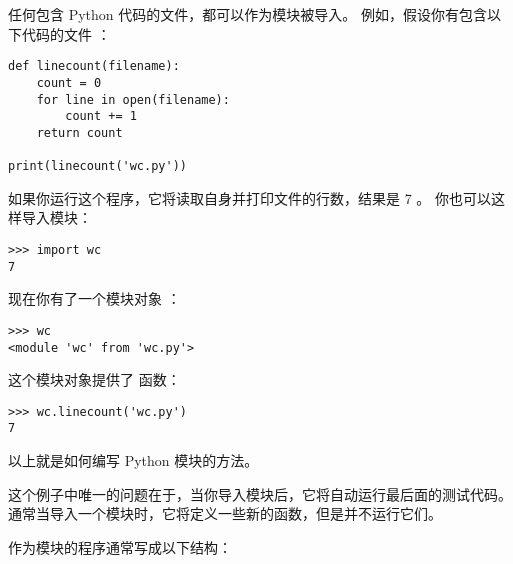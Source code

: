 {{{{{{{任何包含 Python 代码的文件，都可以作为模块被导入。
例如，假设你有包含以下代码的文件  ：

\begin{lstlisting}
def linecount(filename):
    count = 0
    for line in open(filename):
        count += 1
    return count

print(linecount('wc.py'))
\end{lstlisting}

%

如果你运行这个程序，它将读取自身并打印文件的行数，结果是 7 。
你也可以这样导入模块：

\begin{lstlisting}
>>> import wc
7
\end{lstlisting}

%

现在你有了一个模块对象  ：

  

\begin{lstlisting}
>>> wc
<module 'wc' from 'wc.py'>
\end{lstlisting}

%

这个模块对象提供了  函数：

\begin{lstlisting}
>>> wc.linecount('wc.py')
7
\end{lstlisting}

%

以上就是如何编写 Python 模块的方法。


这个例子中唯一的问题在于，当你导入模块后，它将自动运行最后面的测试代码。
通常当导入一个模块时，它将定义一些新的函数，但是并不运行它们。

  


作为模块的程序通常写成以下结构：

}}}}}}}
